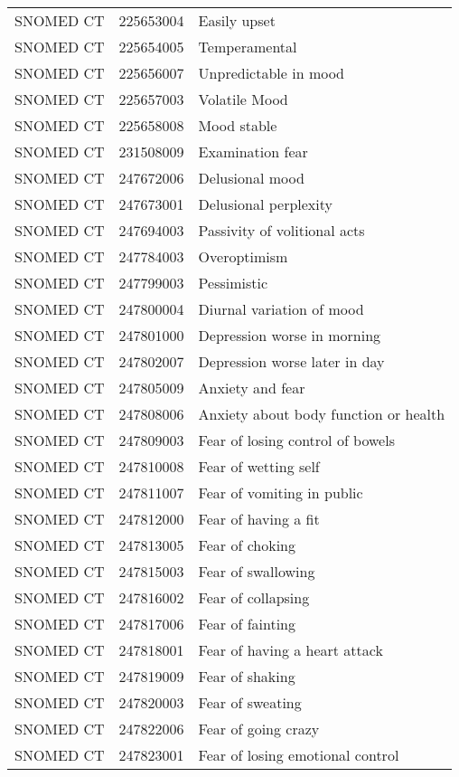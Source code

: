 \begin{longtable}{p{}p{}p{}}
  SNOMED CT & 225653004 & Easily upset \\ 
  SNOMED CT & 225654005 & Temperamental \\ 
  SNOMED CT & 225656007 & Unpredictable in mood \\ 
  SNOMED CT & 225657003 & Volatile Mood \\ 
  SNOMED CT & 225658008 & Mood stable \\ 
  SNOMED CT & 231508009 & Examination fear \\ 
  SNOMED CT & 247672006 & Delusional mood \\ 
  SNOMED CT & 247673001 & Delusional perplexity \\ 
  SNOMED CT & 247694003 & Passivity of volitional acts \\ 
  SNOMED CT & 247784003 & Overoptimism \\ 
  SNOMED CT & 247799003 & Pessimistic \\ 
  SNOMED CT & 247800004 & Diurnal variation of mood \\ 
  SNOMED CT & 247801000 & Depression worse in morning \\ 
  SNOMED CT & 247802007 & Depression worse later in day \\ 
  SNOMED CT & 247805009 & Anxiety and fear \\ 
  SNOMED CT & 247808006 & Anxiety about body function or health \\ 
  SNOMED CT & 247809003 & Fear of losing control of bowels \\ 
  SNOMED CT & 247810008 & Fear of wetting self \\ 
  SNOMED CT & 247811007 & Fear of vomiting in public \\ 
  SNOMED CT & 247812000 & Fear of having a fit \\ 
  SNOMED CT & 247813005 & Fear of choking \\ 
  SNOMED CT & 247815003 & Fear of swallowing \\ 
  SNOMED CT & 247816002 & Fear of collapsing \\ 
  SNOMED CT & 247817006 & Fear of fainting \\ 
  SNOMED CT & 247818001 & Fear of having a heart attack \\ 
  SNOMED CT & 247819009 & Fear of shaking \\ 
  SNOMED CT & 247820003 & Fear of sweating \\ 
  SNOMED CT & 247822006 & Fear of going crazy \\ 
  SNOMED CT & 247823001 & Fear of losing emotional control \\ 

\end{longtable}
